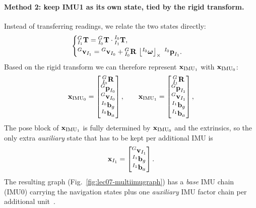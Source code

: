 \paragraph{Method 2: keep IMU1 as its own state, tied by the rigid transform.} Instead of transferring readings, we relate the two states directly:
\begin{align}
\begin{cases}
{}^{G}_{I_1}\boldsymbol{\mathbf{T}} = {}^{G}_{I_0}\boldsymbol{\mathbf{T}}\cdot{}^{I_0}_{I_1}\boldsymbol{\mathbf{T}}, \\[2pt]
{}^{G}\boldsymbol{\mathbf{v}}_{I_1} = {}^{G}\boldsymbol{\mathbf{v}}_{I_0} + {}^{G}_{I_0}\boldsymbol{\mathbf{R}}\,\left\lfloor{}^{I_0}\boldsymbol{\mathbf{\omega}}\right\rfloor_{\times}\;{}^{I_0}\boldsymbol{\mathbf{p}}_{I_1}.
\end{cases}
\end{align}
Based on the rigid transform we can therefore represent $\boldsymbol{\mathbf{x}}_{\mathrm{IMU}_1}$ with $\boldsymbol{\mathbf{x}}_{\mathrm{IMU}_0}$:
\begin{align}
\boldsymbol{\mathbf{x}}_{\mathrm{IMU}_0} =
\begin{bmatrix}
{}^{G}_{I_0}\boldsymbol{\mathbf{R}} \\ {}^{G}\boldsymbol{\mathbf{p}}_{I_0} \\ {}^{G}\boldsymbol{\mathbf{v}}_{I_0} \\ {}^{I_0}\boldsymbol{\mathbf{b}}_g \\ {}^{I_0}\boldsymbol{\mathbf{b}}_a
\end{bmatrix},
\qquad
\boldsymbol{\mathbf{x}}_{\mathrm{IMU}_1} =
\begin{bmatrix}
{}^{G}_{I_1}\boldsymbol{\mathbf{R}} \\ {}^{G}\boldsymbol{\mathbf{p}}_{I_1} \\ {}^{G}\boldsymbol{\mathbf{v}}_{I_1} \\ {}^{I_1}\boldsymbol{\mathbf{b}}_g \\ {}^{I_1}\boldsymbol{\mathbf{b}}_a
\end{bmatrix},
\end{align}
The pose block of $\boldsymbol{\mathbf{x}}_{\mathrm{IMU}_1}$ is fully determined by $\boldsymbol{\mathbf{x}}_{\mathrm{IMU}_0}$ and the extrinsics, so the only extra \emph{auxiliary} state that has to be kept per additional IMU is
\begin{align}
\boldsymbol{\mathbf{x}}_{I_1} = \begin{bmatrix} {}^{G}\boldsymbol{\mathbf{v}}_{I_1} \\ {}^{I_1}\boldsymbol{\mathbf{b}}_g \\ {}^{I_1}\boldsymbol{\mathbf{b}}_a \end{bmatrix}.
\end{align}
The resulting graph (Fig.~\ref{fig:lec07-multiimugraph}) has a \emph{base} IMU chain (IMU0) carrying the navigation states plus one \emph{auxiliary} IMU factor chain per additional unit~\cite{Eckenhoff2021MIMC}.

